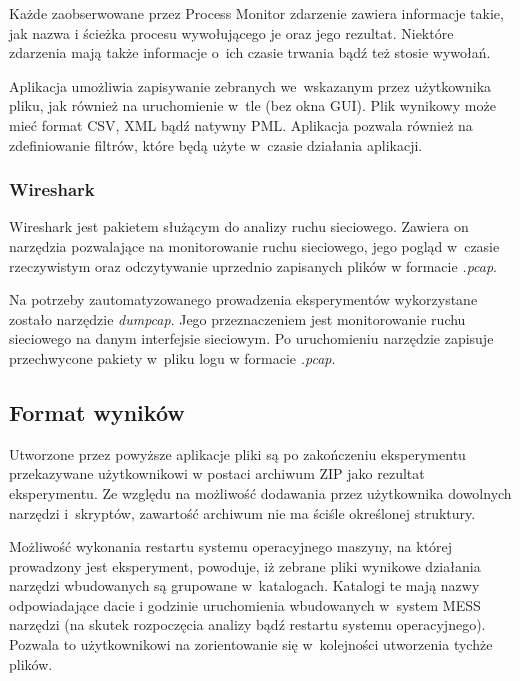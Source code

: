 \documentclass[a4paper,12pt,oneside]{article}
\begin{document}
	Każde zaobserwowane przez Process Monitor zdarzenie zawiera informacje takie, jak nazwa i ścieżka procesu wywołującego je oraz jego rezultat. Niektóre zdarzenia mają także informacje o~ich czasie trwania bądź też stosie wywołań.
	
	Aplikacja umożliwia zapisywanie zebranych we~wskazanym przez użytkownika pliku, jak również na uruchomienie w~tle (bez okna GUI). Plik wynikowy może mieć format CSV, XML bądź natywny PML. Aplikacja pozwala również na zdefiniowanie filtrów, które będą użyte w~czasie działania aplikacji.
	
	\subsubsection{Wireshark}
	
	Wireshark \cite{tool-wireshark} jest pakietem służącym do analizy ruchu sieciowego. Zawiera on narzędzia pozwalające na monitorowanie ruchu sieciowego, jego pogląd w~czasie rzeczywistym oraz odczytywanie uprzednio zapisanych plików w formacie \textit{.pcap}.
	
	Na potrzeby zautomatyzowanego prowadzenia eksperymentów wykorzystane zostało narzędzie \textit{dumpcap}. Jego przeznaczeniem jest monitorowanie ruchu sieciowego na danym interfejsie sieciowym. Po uruchomieniu narzędzie zapisuje przechwycone pakiety w~pliku logu w formacie \textit{.pcap}.
	
	\subsection{Format wyników}
	
	Utworzone przez powyższe aplikacje pliki są po zakończeniu eksperymentu przekazywane użytkownikowi w postaci archiwum ZIP jako rezultat eksperymentu. Ze względu na możliwość dodawania przez użytkownika dowolnych narzędzi i~skryptów, zawartość archiwum nie ma ściśle określonej struktury. 
	
	Możliwość wykonania restartu systemu operacyjnego maszyny, na której prowadzony jest eksperyment, powoduje, iż zebrane pliki wynikowe działania narzędzi wbudowanych są grupowane w~katalogach. Katalogi te mają nazwy odpowiadające dacie i godzinie uruchomienia wbudowanych w~system MESS narzędzi (na skutek rozpoczęcia analizy bądź restartu systemu operacyjnego). Pozwala to użytkownikowi na zorientowanie się w~kolejności utworzenia tychże plików.
				
\end{document}
